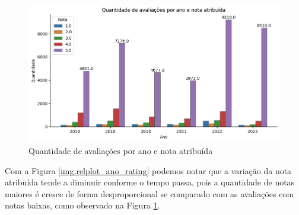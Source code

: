 \begin{figure}
	\centering
	\includegraphics[width=1\textwidth]{figs/exploratoria/quantidade_avaliacao_nota_atribuida_ano.png}
	\caption{Quantidade de avaliações por ano e nota atribuída}
	\label{img:dist_review_rating_per_year}
\end{figure}

Com a Figura \ref{img:relplot_ano_rating} podemos notar que a variação da nota atribuída tende a diminuir conforme o tempo passa, pois a quantidade de notas maiores é cresce de forma desproporcional se comparado com as avaliações com notas baixas, como observado na Figura \ref{img:dist_review_rating_per_year}.


